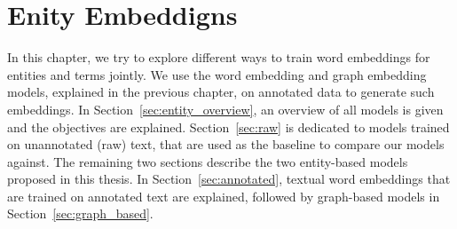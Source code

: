 \chapter{Enity Embeddigns}\label{chap:entity}
In this chapter, we try to explore different ways to train word embeddings for entities and terms jointly. We use the word embedding and graph embedding models, explained in the previous chapter, on annotated data to generate such embeddings. In Section~\ref{sec:entity_overview}, an overview of all models is given and the objectives are explained. Section~\ref{sec:raw} is dedicated to models trained on unannotated (raw) text, that are used as the baseline to compare our models against. The remaining two sections describe the two entity-based models proposed in this thesis. In Section~\ref{sec:annotated},  textual word embeddings that are trained on annotated text are explained, followed by graph-based models in Section~\ref{sec:graph_based}.

